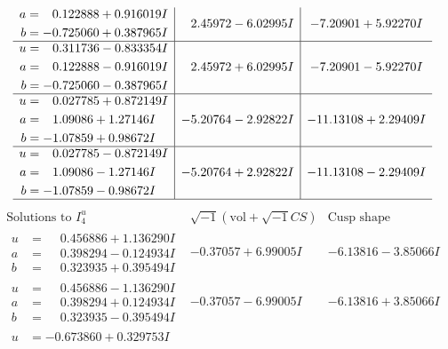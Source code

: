 \documentclass[1p]{elsarticle_modified}
\theoremstyle{definition}
\newcommand{\I}{\sqrt{-1}}
\begin{document}
$$\begin{array}{c|c|c}
\begin{aligned}
a &= \phantom{-}0.122888 + 0.916019 I \\
b &= -0.725060 + 0.387965 I\end{aligned}
 & \phantom{-}2.45972 - 6.02995 I & -7.20901 + 5.92270 I \\ \hline\begin{aligned}
u &= \phantom{-}0.311736 - 0.833354 I \\
a &= \phantom{-}0.122888 - 0.916019 I \\
b &= -0.725060 - 0.387965 I\end{aligned}
 & \phantom{-}2.45972 + 6.02995 I & -7.20901 - 5.92270 I \\ \hline\begin{aligned}
u &= \phantom{-}0.027785 + 0.872149 I \\
a &= \phantom{-}1.09086 + 1.27146 I \\
b &= -1.07859 + 0.98672 I\end{aligned}
 & -5.20764 - 2.92822 I & -11.13108 + 2.29409 I \\ \hline\begin{aligned}
u &= \phantom{-}0.027785 - 0.872149 I \\
a &= \phantom{-}1.09086 - 1.27146 I \\
b &= -1.07859 - 0.98672 I\end{aligned}
 & -5.20764 + 2.92822 I & -11.13108 - 2.29409 I\\
 \hline 
 \end{array}$$\newpage$$\begin{array}{c|c|c}  
\text{Solutions to }I^u_{4}& \I (\text{vol} + \sqrt{-1}CS) & \text{Cusp shape}\\
 \hline 
\begin{aligned}
u &= \phantom{-}0.456886 + 1.136290 I \\
a &= \phantom{-}0.398294 - 0.124934 I \\
b &= \phantom{-}0.323935 + 0.395494 I\end{aligned}
 & -0.37057 + 6.99005 I & -6.13816 - 3.85066 I \\ \hline\begin{aligned}
u &= \phantom{-}0.456886 - 1.136290 I \\
a &= \phantom{-}0.398294 + 0.124934 I \\
b &= \phantom{-}0.323935 - 0.395494 I\end{aligned}
 & -0.37057 - 6.99005 I & -6.13816 + 3.85066 I \\ \hline\begin{aligned}
u &= -0.673860 + 0.329753 I \\

\end{aligned}
\end{array}$$
\end{document}
